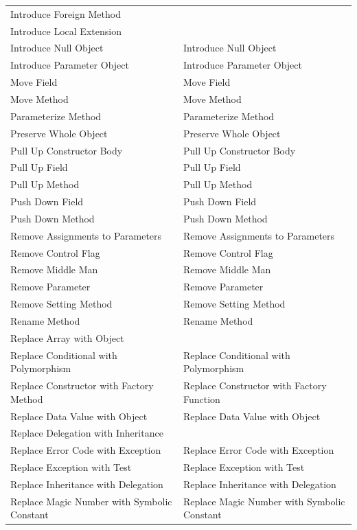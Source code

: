 \documentclass[11pt,a4paper,oneside]{book}
\begin{document}
\begin{longtable}{|p{200pt}|p{200pt}|}
    Introduce Foreign Method & \\ 
    Introduce Local Extension & \\ 
    Introduce Null Object & Introduce Null Object\\ 
    Introduce Parameter Object & Introduce Parameter Object\\ 
    Move Field & Move Field\\ 
    Move Method & Move Method\\ 
    Parameterize Method & Parameterize Method\\ 
    Preserve Whole Object & Preserve Whole Object\\ 
    Pull Up Constructor Body & Pull Up Constructor Body\\ 
    Pull Up Field & Pull Up Field\\ 
    Pull Up Method & Pull Up Method\\ 
    Push Down Field & Push Down Field\\ 
    Push Down Method & Push Down Method\\ 
    Remove Assignments to Parameters & Remove Assignments to Parameters \\ 
    Remove Control Flag & Remove Control Flag\\ 
    Remove Middle Man & Remove Middle Man\\ 
    Remove Parameter & Remove Parameter \\ 
    Remove Setting Method & Remove Setting Method\\ 
    Rename Method & Rename Method\\ 
    Replace Array with Object & \\ 
    Replace Conditional with Polymorphism & Replace Conditional with Polymorphism\\ 
    Replace Constructor with Factory Method & Replace Constructor with Factory Function\\ 
    Replace Data Value with Object & Replace Data Value with Object\\ 
    Replace Delegation with Inheritance & \\ 
    Replace Error Code with Exception & Replace Error Code with Exception\\ 
    Replace Exception with Test & Replace Exception with Test\\ 
    Replace Inheritance with Delegation & Replace Inheritance with Delegation\\ 
    Replace Magic Number with Symbolic Constant & Replace Magic Number with Symbolic Constant\\ 

\end{longtable}
\end{document}
